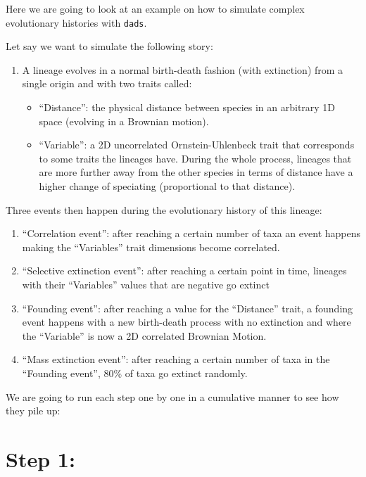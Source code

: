 \documentclass[]{book}
\providecommand{\tightlist}{%
  \setlength{\itemsep}{0pt}\setlength{\parskip}{0pt}}
\begin{document}
Here we are going to look at an example on how to simulate complex evolutionary histories with \texttt{dads}.

Let say we want to simulate the following story:

\begin{enumerate}
\def\labelenumi{\arabic{enumi}.}
\tightlist
\item
  A lineage evolves in a normal birth-death fashion (with extinction) from a single origin and with two traits called:

  \begin{itemize}
  \tightlist
  \item
    ``Distance'': the physical distance between species in an arbitrary 1D space (evolving in a Brownian motion).
  \item
    ``Variable'': a 2D uncorrelated Ornstein-Uhlenbeck trait that corresponds to some traits the lineages have.
    During the whole process, lineages that are more further away from the other species in terms of distance have a higher change of speciating (proportional to that distance).
  \end{itemize}
\end{enumerate}

Three events then happen during the evolutionary history of this lineage:

\begin{enumerate}
\def\labelenumi{\arabic{enumi}.}
\setcounter{enumi}{1}
\tightlist
\item
  ``Correlation event'': after reaching a certain number of taxa an event happens making the ``Variables'' trait dimensions become correlated.
\item
  ``Selective extinction event'': after reaching a certain point in time, lineages with their ``Variables'' values that are negative go extinct
\item
  ``Founding event'': after reaching a value for the ``Distance'' trait, a founding event happens with a new birth-death process with no extinction and where the ``Variable'' is now a 2D correlated Brownian Motion.
\item
  ``Mass extinction event'': after reaching a certain number of taxa in the ``Founding event'', 80\% of taxa go extinct randomly.
\end{enumerate}

We are going to run each step one by one in a cumulative manner to see how they pile up:

\hypertarget{step-1}{%
\section{Step 1:}\label{step-1}}
\end{document}
